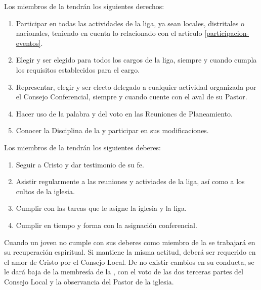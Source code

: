 

\article
Los miembros de la \LMJ{} tendrán los siguientes derechos:
\label{derechos-miembros}
\begin{enumerate}
    \item Participar en todas las actividades de la liga, ya sean locales, distritales o nacionales, teniendo en cuenta lo relacionado con el artículo \ref{participacion-eventos}.
    \item Elegir y ser elegido para todos los cargos de la liga, siempre y cuando cumpla los requisitos establecidos para el cargo.
    \item Representar, elegir y ser electo delegado a cualquier actividad organizada por el Consejo Conferencial, siempre y cuando cuente con el aval de su Pastor.
    \item Hacer uso de la palabra y del voto en las Reuniones de Planeamiento.
    \item Conocer la Disciplina de la \LMJ{} y participar en sus modificaciones.
\end{enumerate}

\article
\label{deberes-miembros}
Los miembros de la \LMJ{} tendrán los siguientes deberes:
\begin{enumerate}
    \item Seguir a Cristo y dar testimonio de su fe.
    \item Asistir regularmente a las reuniones y activiades de la liga, así como a los cultos de la iglesia.
    \item Cumplir con las tareas que le asigne la iglesia y la liga.
    \item Cumplir en tiempo y forma con la asignación conferencial.
\end{enumerate}

\article
Cuando un joven no cumple con sus deberes como miembro de la \LMJ{} se trabajará en su recuperación espiritual. Si mantiene la misma actitud, deberá ser requerido en el amor de Cristo por el Consejo Local. De no existir cambios en su conducta, se le dará baja de la membresía de la \LMJ{}, con el voto de las dos terceras partes del Consejo Local y la observancia del Pastor de la iglesia.
